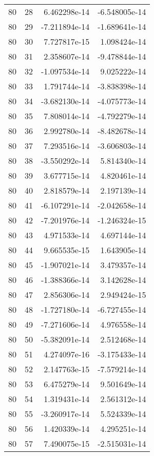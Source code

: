 \begin{tabular}{rrrr}
  80 &   28 &  6.462298e-14 & -6.548005e-14 \\
  80 &   29 & -7.211894e-14 & -1.689641e-14 \\
  80 &   30 &  7.727817e-15 &  1.098424e-14 \\
  80 &   31 &  2.358607e-14 & -9.478844e-14 \\
  80 &   32 & -1.097534e-14 &  9.025222e-14 \\
  80 &   33 &  1.791744e-14 & -3.838398e-14 \\
  80 &   34 & -3.682130e-14 & -4.075773e-14 \\
  80 &   35 &  7.808014e-14 & -4.792279e-14 \\
  80 &   36 &  2.992780e-14 & -8.482678e-14 \\
  80 &   37 &  7.293516e-14 & -3.606803e-14 \\
  80 &   38 & -3.550292e-14 &  5.814340e-14 \\
  80 &   39 &  3.677715e-14 &  4.820461e-14 \\
  80 &   40 &  2.818579e-14 &  2.197139e-14 \\
  80 &   41 & -6.107291e-14 & -2.042658e-14 \\
  80 &   42 & -7.201976e-14 & -1.246324e-15 \\
  80 &   43 &  4.971533e-14 &  4.697144e-14 \\
  80 &   44 &  9.665535e-15 &  1.643905e-14 \\
  80 &   45 & -1.907021e-14 &  3.479357e-14 \\
  80 &   46 & -1.388366e-14 &  3.142628e-14 \\
  80 &   47 &  2.856306e-14 &  2.949424e-15 \\
  80 &   48 & -1.727180e-14 & -6.727455e-14 \\
  80 &   49 & -7.271606e-14 &  4.976558e-14 \\
  80 &   50 & -5.382091e-14 &  2.512468e-14 \\
  80 &   51 &  4.274097e-16 & -3.175433e-14 \\
  80 &   52 &  2.147763e-15 & -7.579214e-14 \\
  80 &   53 &  6.475279e-14 &  9.501649e-14 \\
  80 &   54 &  1.319431e-14 &  2.561312e-14 \\
  80 &   55 & -3.260917e-14 &  5.524339e-14 \\
  80 &   56 &  1.420339e-14 &  4.295251e-14 \\
  80 &   57 &  7.490075e-15 & -2.515031e-14 \\

\end{tabular}

